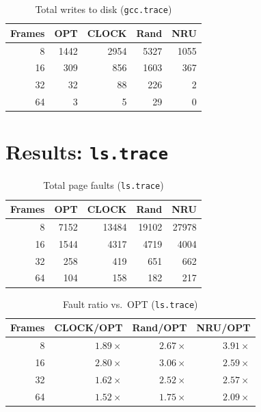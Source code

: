 \documentclass[11pt]{article}
\begin{document}
\begin{table}[h]
  \centering
  \caption{Total writes to disk (\texttt{gcc.trace})}
  \begin{tabular}{@{}r rrrr@{}}
    \toprule
    Frames & OPT & CLOCK & Rand & NRU \\
    \midrule
     8 & \num{1442} & \num{2954} & \num{5327} & \num{1055} \\
    16 &  \num{309} &  \num{856} & \num{1603} &  \num{367} \\
    32 &   \num{32} &   \num{88} &  \num{226} &    \num{2} \\
    64 &    \num{3} &    \num{5} &   \num{29} &    \num{0} \\
    \bottomrule
  \end{tabular}
\end{table}

\section{Results: \texttt{ls.trace}}

\begin{table}[h]
  \centering
  \caption{Total page faults (\texttt{ls.trace})}
  \begin{tabular}{@{}r rrrr@{}}
    \toprule
    Frames & OPT & CLOCK & Rand & NRU \\
    \midrule
     8 & \num{7152} & \num{13484} & \num{19102} & \num{27978} \\
    16 &  \num{1544} &  \num{4317} &  \num{4719} &  \num{4004} \\
    32 &   \num{258} &   \num{419} &   \num{651} &   \num{662} \\
    64 &   \num{104} &   \num{158} &   \num{182} &   \num{217} \\
    \bottomrule
  \end{tabular}
\end{table}

\begin{table}[h]
  \centering
  \caption{Fault ratio vs.\ OPT (\texttt{ls.trace})}
  \begin{tabular}{@{}r rrr@{}}
    \toprule
    Frames & CLOCK/OPT & Rand/OPT & NRU/OPT \\
    \midrule
     8 & $1.89\times$ & $2.67\times$ & $3.91\times$ \\
    16 & $2.80\times$ & $3.06\times$ & $2.59\times$ \\
    32 & $1.62\times$ & $2.52\times$ & $2.57\times$ \\
    64 & $1.52\times$ & $1.75\times$ & $2.09\times$ \\
    \bottomrule
  \end{tabular}
\end{table}
\end{document}
